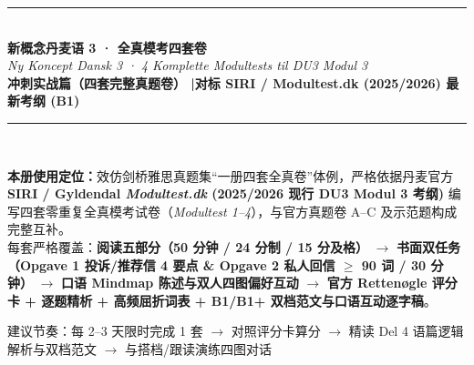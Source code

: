 \documentclass[11pt, a4paper]{ctexart}
\begin{document}
\begin{titlepage}
  \centering
  \vspace*{2.2cm}
  {\color{NCDRed}\rule{\linewidth}{2.5pt}}\\[1.1cm]
  {\fontsize{30}{36}\selectfont\bfseries\color{NCDNavy} 新概念丹麦语 3 · 全真模考四套卷}\\[0.5cm]
  {\LARGE\itshape\color{NCDTeal} Ny Koncept Dansk 3 · 4 Komplette Modultests til DU3 Modul 3}\\[0.8cm]
  {\large\bfseries\color{NCDGray} 冲刺实战篇（四套完整真题卷） \quad|\quad 对标 SIRI / Modultest.dk (2025/2026) 最新考纲 (B1)}\\[1.1cm]
  {\color{NCDRed}\rule{\linewidth}{2.5pt}}\\[1.8cm]

  \begin{tcolorbox}[
    colback=NCDBgBlue,
    colframe=NCDNavy,
    width=0.90\linewidth,
    arc=4pt,
    boxrule=0.8pt,
    left=14pt, right=14pt, top=12pt, bottom=12pt
  ]
    \textbf{\color{NCDNavy}本册使用定位：}效仿剑桥雅思真题集“一册四套全真卷”体例，严格依据丹麦官方 \textbf{SIRI / Gyldendal \textit{Modultest.dk} (2025/2026 现行 DU3 Modul 3 考纲)} 编写四套零重复全真模考试卷（\textit{Modultest 1--4}），与官方真题卷 A--C 及示范题构成完整互补。\\[4pt]
    每套严格覆盖：\textbf{阅读五部分（50 分钟 / 24 分制 / 15 分及格）} $\rightarrow$ \textbf{书面双任务（Opgave 1 投诉/推荐信 4 要点 \& Opgave 2 私人回信 $\ge$ 90 词 / 30 分钟）} $\rightarrow$ \textbf{口语 Mindmap 陈述与双人四图偏好互动} $\rightarrow$ \textbf{官方 Rettenøgle 评分卡 + 逐题精析 + 高频屈折词表 + B1/B1+ 双档范文与口语互动逐字稿}。
  \end{tcolorbox}

  \vfill
  {\large\color{NCDGray} 建议节奏：每 2--3 天限时完成 1 套 $\rightarrow$ 对照评分卡算分 $\rightarrow$ 精读 Del 4 语篇逻辑解析与双档范文 $\rightarrow$ 与搭档/跟读演练四图对话}
\end{titlepage}

\tableofcontents
\clearpage

{}
\end{document}
